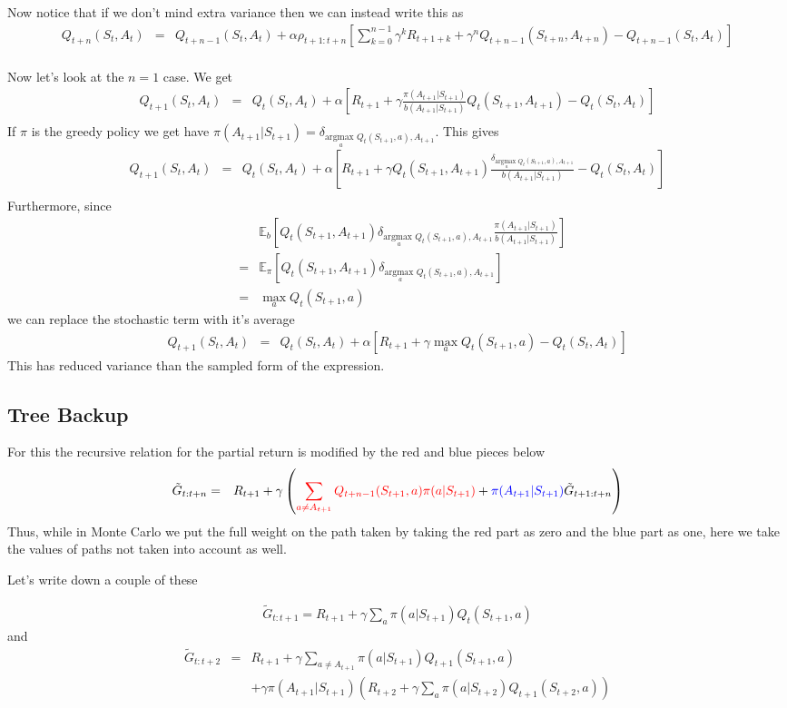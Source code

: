 \documentclass[11pt,a4paper]{article}
\newcommand\bea{\begin{eqnarray}}
\newcommand\eea{\end{eqnarray}}
\newcommand{\nn}{\nonumber \\}
\newcommand{\argmax}[1]{\underset{#1}{\text{argmax }}}
\begin{document}
Now notice that if we don't mind extra variance then we can instead write this as
\bea
Q_{t+n} (S_t,A_t) &=&  Q_{t+n-1}(S_t,A_t) + \alpha \rho_{t+1:t+n}  [\sum_{k=0}^{n-1} \gamma^k R_{t+1+k} + \gamma^n Q_{t+n-1}(S_{t+n},A_{t+n}) - Q_{t+n-1}(S_t,A_t) ] \nn
\eea



Now let's look at the $n=1$ case. We get
\bea
Q_{t+1} (S_t,A_t) &=& Q_{t}(S_t,A_t) + \alpha [  R_{t+1}  + \gamma  \frac{\pi(A_{t+1}|S_{t+1})}{b(A_{t+1}|S_{t+1})}  Q_{t}(S_{t+1},A_{t+1}) - Q_{t}(S_t,A_t) ] \nn
\eea
If $\pi$ is the greedy policy we get have $\pi(A_{t+1}|S_{t+1}) =\delta_{\argmax{a}Q_t(S_{t+1},a),A_{t+1}}$. This gives 
\bea
Q_{t+1} (S_t,A_t) &=& Q_{t}(S_t,A_t) + \alpha [  R_{t+1}  + \gamma Q_{t}(S_{t+1},A_{t+1})  \frac{\delta_{\argmax{a} Q_t(S_{t+1},a),A_{t+1}}}{b(A_{t+1}|S_{t+1})}  - Q_{t} (S_t,A_t)] \nn
\eea
Furthermore, since
\bea
&&\mathbb E_b[ Q_t(S_{t+1},A_{t+1} ) \delta_{\argmax{a} Q_t(S_{t+1},a),A_{t+1}}\frac{\pi(A_{t+1}|S_{t+1})}{b(A_{t+1}|S_{t+1})} ]  \nn
&=& \mathbb E_\pi [ Q_t(S_{t+1},A_{t+1} )\delta_{\argmax{a} Q_t(S_{t+1},a),A_{t+1}}] \nn
&=& \max_a Q_t(S_{t+1},a)
\eea
we can replace the stochastic term with it's average 
\bea
Q_{t+1} (S_t,A_t) &=& Q_{t}(S_t,A_t) + \alpha [  R_{t+1}  + \gamma \max_a Q_t(S_{t+1},a) - Q_{t}(S_t,A_t)] 
\eea
This has reduced variance than the sampled form of the expression.



\subsection{Tree Backup}

For this the recursive relation for the partial return is modified by the red and blue pieces below
\bea
\tilde G_{t:t+n}  &=& R_{t+1} + \gamma \left( {\color{red} \sum_{a \ne A_{t+1}} Q_{t+n-1}(S_{t+1},a) \pi(a|S_{t+1}) } + {\color{blue} \pi(A_{t+1}|S_{t+1}) } \tilde G_{t+1:t+n} \right) \nn
\eea
Thus, while in Monte Carlo we put the full weight on the path taken by taking the red part as zero and the blue part as one, here we take the values of paths not taken into account as well.

Let's write down a couple of these 

\bea
\tilde G_{t:t+1}  = R_{t+1} + \gamma \sum_a \pi(a|S_{t+1}) Q_{t}(S_{t+1},a)
\eea
and
\bea
\tilde G_{t:t+2} &=&  R_{t+1} + \gamma \sum_{a \ne A_{t+1}} \pi(a|S_{t+1}) Q_{t+1} (S_{t+1},a) \nn
&& + \gamma \pi(A_{t+1}|S_{t+1})  \left(R_{t+2} + \gamma \sum_a \pi(a|S_{t+2}) Q_{t+1}(S_{t+2},a)
 \right)
\eea
\end{document}
